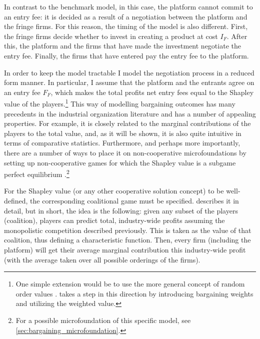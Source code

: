 \documentclass[a4paper]{article}
\begin{document}
In contrast to the benchmark model, in this case, the platform cannot commit to an entry fee: it is decided as a result of a negotiation between the platform and the fringe firms.
For this reason, the timing of the model is also different.
First, the fringe firms decide whether to invest in creating a product at cost $I_F$.
After this, the platform and the firms that have made the investment negotiate the entry fee.
Finally, the firms that have entered pay the entry fee to the platform.

In order to keep the model tractable I model the negotiation process in a reduced form manner.
In particular, I assume that the platform and the entrants agree on an entry fee $F_F$, which makes the total profits net entry fees equal to the Shapley value of the players.\footnote{
    One simple extension would be to use the more general concept of random order values \parencite{weber1988probabilistic}.
     takes a step in this direction by introducing bargaining weights and utilizing the weighted value.
}
This way of modelling bargaining outcomes has many precedents in the industrial organization literature \parencite[e.g.][]{montez2007downstream,hart1990property,levy1997individual,inderst2003bargaining,brugemann2019intra} and has a number of appealing properties.
For example, it is closely related to the marginal contributions of the players to the total value, and, as it will be shown, it is also quite intuitive in terms of comparative statistics.
Furthermore, and perhaps more importantly, there are a number of ways to place it on non-cooperative microfoundations by setting up non-cooperative games for which the Shapley value is a subgame perfect equilibrium \parencite[e.g.][]{gul1989bargaining,hart1996bargaining,stole1996organizational}.\footnote{
    For a possible microfoundation of this specific model, see \cref{sec:bargaining_microfoundation}.
}

For the Shapley value (or any other cooperative solution concept) to be well-defined, the corresponding coalitional game must be specified.
 describes it in detail, but in short, the idea is the following: given any subset of the players (coalition), players can predict total, industry-wide profits assuming the monopolistic competition described previously.
This is taken as the value of that coalition, thus defining a characteristic function.
Then, every firm (including the platform) will get their average marginal contribution this industry-wide profit (with the average taken over all possible orderings of the firms).
\end{document}
